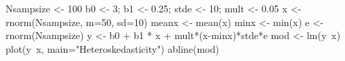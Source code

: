 \begin{Schunk}
\begin{Sinput}
 Nsampsize <- 100
 b0 <- 3; b1 <- 0.25; stde <- 10; mult <- 0.05
 x <- rnorm(Nsampsize, m=50, sd=10)
 meanx <- mean(x)
 minx <- min(x)
 e <- rnorm(Nsampsize)
 y <- b0 + b1 * x + mult*(x-minx)*stde*e
 mod <- lm(y~x)
 plot(y~x, main="Heteroskedasticity")
 abline(mod)
\end{Sinput}
\end{Schunk}
